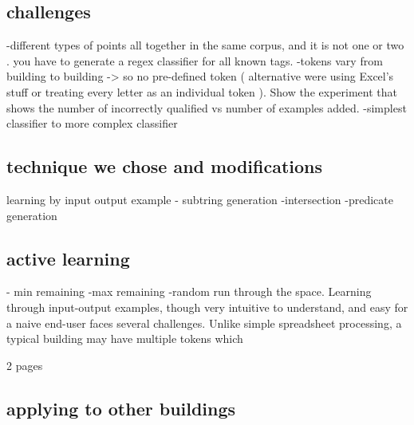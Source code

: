 \subsection{challenges}


-different types of points all together in the same corpus, and it is not one or two . you have to generate a regex classifier for all known tags. 
-tokens vary from building to building -> so no pre-defined token ( alternative were using Excel's stuff or treating every letter as an individual token ). Show the experiment that shows the number of incorrectly qualified vs number of examples added.
-simplest classifier to more complex classifier



\subsection{technique we chose and modifications}

learning by input output example
- subtring generation
-intersection
-predicate generation


\subsection{active learning}

- min remaining
-max remaining 
-random run through the space.
Learning through input-output examples, though very intuitive to understand, and easy for a naive end-user faces several challenges. Unlike simple spreadsheet processing, a typical building may have multiple tokens  which 



2 pages




\subsection{applying to other buildings}







